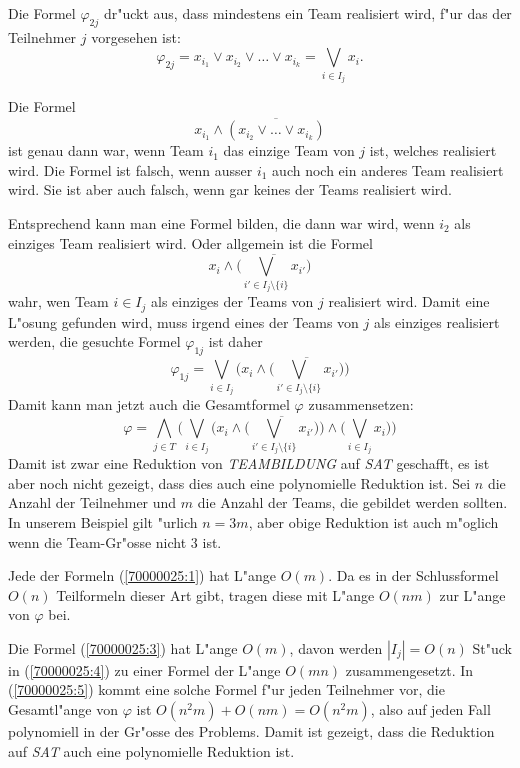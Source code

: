 \begin{loesung}
Die Formel $\varphi_{2j}$ dr"uckt aus, dass mindestens ein Team realisiert
wird, f"ur das der Teilnehmer $j$ vorgesehen ist:
\begin{equation}
\varphi_{2j}=x_{i_1}\vee x_{i_2}\vee\dots\vee x_{i_k} = \bigvee_{i\in I_j}x_i.
\label{70000025:1}
\end{equation}

Die Formel
\begin{equation}
x_{i_1}\wedge\overline{(x_{i_2}\vee\dots\vee x_{i_k})}
\label{70000025:2}
\end{equation}
ist genau dann war, wenn Team $i_1$ das einzige Team von $j$ ist,
welches realisiert wird. Die Formel ist falsch, wenn ausser $i_1$ auch
noch ein anderes Team realisiert wird. Sie ist aber auch falsch, wenn 
gar keines der Teams realisiert wird.

Entsprechend kann man eine Formel bilden, die dann war wird, wenn $i_2$ als 
einziges Team realisiert wird. Oder allgemein ist
die Formel
\begin{equation}
x_i\wedge \overline{\biggl(\bigvee_{i'\in I_j\setminus\{i\}}x_{i'}\biggr)}
\label{70000025:3}
\end{equation}
wahr, wen Team $i\in I_j$ als einziges der Teams von $j$ realisiert wird.
Damit eine L"osung gefunden wird, muss irgend eines der Teams von $j$ als
einziges realisiert werden,
die gesuchte Formel $\varphi_{1j}$ ist daher
\begin{equation}
\varphi_{1j} = 
\bigvee_{i\in I_j} \biggl(x_i\wedge
	\overline{\biggl(\bigvee_{i'\in I_j\setminus \{i\}}x_{i'}\biggr)}\biggr)
\label{70000025:4}
\end{equation}
Damit kann man jetzt auch die Gesamtformel $\varphi$ zusammensetzen:
\begin{equation}
\varphi=
\bigwedge_{j\in T}
\biggl(
\bigvee_{i\in I_j} \biggl(x_i\wedge
	\overline{\biggl(\bigvee_{i'\in I_j\setminus \{i\}}x_{i'}\biggr)}\biggr)
\wedge
\biggl(
\bigvee_{i\in I_j}x_i
\biggr)
\biggr)
\label{70000025:5}
\end{equation}
Damit ist zwar eine Reduktion von \textsl{TEAMBILDUNG} auf \textsl{SAT}
geschafft, es ist aber noch nicht gezeigt, dass dies auch eine polynomielle
Reduktion ist. Sei $n$ die Anzahl der Teilnehmer und $m$ die Anzahl der
Teams, die gebildet werden sollten. In unserem Beispiel gilt "urlich $n=3m$,
aber obige Reduktion ist auch m"oglich wenn die Team-Gr"osse nicht $3$
ist.

Jede der Formeln (\ref{70000025:1}) hat L"ange $O(m)$.
Da es in der Schlussformel $O(n)$ Teilformeln dieser Art gibt, 
tragen diese mit L"ange $O(nm)$ zur L"ange von $\varphi$ bei.

Die Formel (\ref{70000025:3}) hat L"ange $O(m)$, davon werden $|I_j|=O(n)$
St"uck
in (\ref{70000025:4}) zu einer Formel der L"ange $O(mn)$ zusammengesetzt.
In (\ref{70000025:5}) kommt eine solche Formel f"ur jeden Teilnehmer vor,
die Gesamtl"ange von $\varphi$ ist $O(n^2m) + O(nm)=O(n^2m)$, also auf
jeden Fall polynomiell in der Gr"osse des Problems. Damit ist gezeigt,
dass die Reduktion auf \textsl{SAT} auch eine polynomielle Reduktion ist.
\end{loesung}

